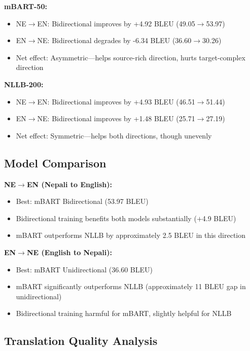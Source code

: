 \documentclass[manuscript, screen, review]{acmart}
\begin{document}
\textbf{mBART-50:}

\begin{itemize}
\item NE$\rightarrow$EN: Bidirectional improves by +4.92 BLEU (49.05$\rightarrow$53.97)
\item EN$\rightarrow$NE: Bidirectional degrades by -6.34 BLEU (36.60$\rightarrow$30.26)
\item Net effect: Asymmetric—helps source-rich direction, hurts target-complex direction
\end{itemize}

\textbf{NLLB-200:}

\begin{itemize}
\item NE$\rightarrow$EN: Bidirectional improves by +4.93 BLEU (46.51$\rightarrow$51.44)
\item EN$\rightarrow$NE: Bidirectional improves by +1.48 BLEU (25.71$\rightarrow$27.19)
\item Net effect: Symmetric—helps both directions, though unevenly
\end{itemize}

\subsection{Model Comparison}
\label{subsec:model_comp}

\textbf{NE$\rightarrow$EN (Nepali to English):}

\begin{itemize}
\item Best: mBART Bidirectional (53.97 BLEU)
\item Bidirectional training benefits both models substantially ($+$4.9 BLEU)
\item mBART outperforms NLLB by approximately 2.5 BLEU in this direction
\end{itemize}

\textbf{EN$\rightarrow$NE (English to Nepali):}

\begin{itemize}
\item Best: mBART Unidirectional (36.60 BLEU)
\item mBART significantly outperforms NLLB (approximately 11 BLEU gap in unidirectional)
\item Bidirectional training harmful for mBART, slightly helpful for NLLB
\end{itemize}

\subsection{Translation Quality Analysis}
\label{subsec:quality_analysis}
\end{document}
